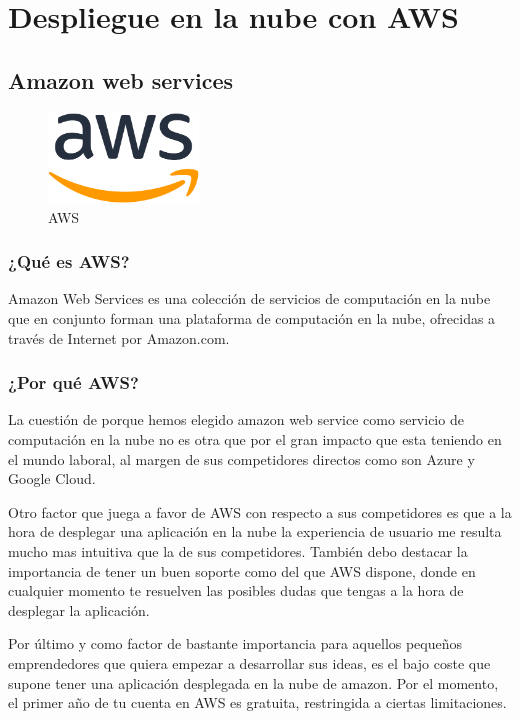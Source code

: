 \chapter{Despliegue en la nube con AWS}

\section{Amazon web services}

\begin{figure}[H]
    \centering
    \includegraphics[width=40mm]{memoria/LaTeX/img/despliegue/aws2.png}
    \caption{AWS}
\end{figure}

\subsection{¿Qué es AWS?}
Amazon Web Services es una colección de servicios de computación en la nube que en conjunto forman una plataforma de computación en la nube, ofrecidas a través de Internet por Amazon.com.

\subsection{¿Por qué AWS?}
La cuestión de porque hemos elegido amazon web service como servicio de computación en la nube no es otra que por el gran impacto que esta teniendo en el mundo laboral, al margen de sus competidores directos como son Azure y Google Cloud.

Otro factor que juega a favor de AWS con respecto a sus competidores es que a la hora de desplegar una aplicación en la nube la experiencia de usuario me resulta mucho mas intuitiva que la de sus competidores. También debo destacar la importancia de tener un buen soporte como del que AWS dispone, donde en cualquier momento te resuelven las posibles dudas que tengas a la hora de desplegar la aplicación.

Por último y como factor de bastante importancia para aquellos pequeños emprendedores que quiera empezar a desarrollar sus ideas, es el bajo coste que supone tener una aplicación desplegada en la nube de amazon. Por el momento, el primer año de tu cuenta en AWS es gratuita, restringida a ciertas limitaciones.

